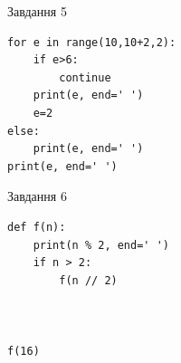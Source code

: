 \documentclass[12pt, ukrainian]{article}
\begin{document}
{\vspace{15mm}
\begin{minipage}[t]{9.7cm}                
{\begin{center}Завдання {5}\end{center}}
\begin{verbatim}
for e in range(10,10+2,2):
    if e>6:
        continue
    print(e, end=' ')
    e=2
else:
    print(e, end=' ')
print(e, end=' ')
\end{verbatim}     
\end{minipage}
\vline \hspace{8mm}
\begin{minipage}[t]{8.0cm}                
{\begin{center}Завдання {6}\end{center}}
\begin{verbatim}
def f(n):
    print(n % 2, end=' ')
    if n > 2:
        f(n // 2)
    


f(16)
\end{verbatim}     
\end{minipage}

}
\newpage
\end{document}
